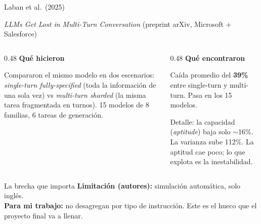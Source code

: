 \documentclass[aspectratio=169, 11pt]{beamer}
\begin{document}
\begin{frame}{Laban et al.\ (2025)}

\textit{LLMs Get Lost in Multi-Turn Conversation} (preprint arXiv, Microsoft + Salesforce)

\vspace{0.6em}

\begin{columns}[T]
\begin{column}{0.48\textwidth}
\textbf{Qu\'e hicieron}

\vspace{0.3em}
\footnotesize
Compararon el mismo modelo en dos escenarios: \emph{single-turn fully-specified} (toda la informaci\'on de una sola vez) vs \emph{multi-turn sharded} (la misma tarea fragmentada en turnos). 15 modelos de 8 familias, 6 tareas de generaci\'on.
\end{column}

\begin{column}{0.48\textwidth}
\textbf{Qu\'e encontraron}

\vspace{0.3em}
\footnotesize
Ca\'ida promedio del \alert{\textbf{39\%}} entre single-turn y multi-turn. Pasa en \alert{los 15 modelos}.

\vspace{0.6em}

Detalle: la capacidad (\emph{aptitude}) baja solo $\sim$16\%. La \alert{varianza sube 112\%}. La aptitud cae poco; lo que explota es la inestabilidad.
\end{column}
\end{columns}

\vspace{0.6em}

\begin{alertblock}{La brecha que importa}
\footnotesize
\textbf{Limitaci\'on (autores):} simulaci\'on autom\'atica, solo ingl\'es. \\
\textbf{Para mi trabajo:} \alert{no desagregan por tipo de instrucci\'on}. Este es el hueco que el proyecto final va a llenar.
\end{alertblock}

\end{frame}

\end{document}
